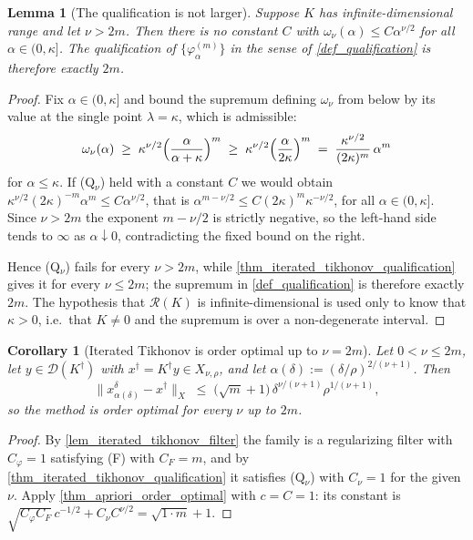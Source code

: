 \documentclass[a4paper]{report}
\theoremstyle{plain}
\newtheorem{lemma}[theorem]{Lemma}
\newtheorem{corollary}[theorem]{Corollary}
\theoremstyle{definition}
\theoremstyle{remark}
\newcommand{\Ran}{\mathcal{R}}
\newcommand{\Dom}{\mathcal{D}}
\newcommand{\dg}{^{\dagger}}
\begin{document}
\begin{lemma}[The qualification is not larger]
  \label{lem_iterated_tikhonov_qualification_sharp}
  Suppose $K$ has infinite-dimensional range and let $\nu > 2m$.  Then there is no
  constant $C$ with $\omega_{\nu}(\alpha) \le C\alpha^{\nu/2}$ for all
  $\alpha \in (0,\kappa]$.  The qualification of $\{\varphi^{(m)}_{\alpha}\}$ in the sense
  of \cref{def_qualification} is therefore exactly $2m$.
\end{lemma}
\begin{proof}
  Fix $\alpha \in (0,\kappa]$ and bound the supremum defining $\omega_{\nu}$ from below by
  its value at the single point $\lambda = \kappa$, which is admissible:
  \[
    \omega_{\nu}(\alpha) \;\ge\; \kappa^{\nu/2}
      \Bigl(\frac{\alpha}{\alpha+\kappa}\Bigr)^{m}
      \;\ge\; \kappa^{\nu/2}\Bigl(\frac{\alpha}{2\kappa}\Bigr)^{m}
      \;=\; \frac{\kappa^{\nu/2}}{(2\kappa)^{m}}\,\alpha^{m}
  \]
  for $\alpha \le \kappa$.  If (Q$_{\nu}$) held with a constant $C$ we would obtain
  $\kappa^{\nu/2}(2\kappa)^{-m}\alpha^{m} \le C\alpha^{\nu/2}$, that is
  $\alpha^{m-\nu/2} \le C(2\kappa)^{m}\kappa^{-\nu/2}$, for all $\alpha \in (0,\kappa]$.
  Since $\nu > 2m$ the exponent $m-\nu/2$ is strictly negative, so the left-hand side
  tends to $\infty$ as $\alpha \downarrow 0$, contradicting the fixed bound on the right.

  Hence (Q$_{\nu}$) fails for every $\nu > 2m$, while
  \cref{thm_iterated_tikhonov_qualification} gives it for every $\nu \le 2m$; the
  supremum in \cref{def_qualification} is therefore exactly $2m$.  The hypothesis that
  $\Ran(K)$ is infinite-dimensional is used only to know that $\kappa > 0$, i.e.\ that
  $K \ne 0$ and the supremum is over a non-degenerate interval.
\end{proof}


\begin{corollary}[Iterated Tikhonov is order optimal up to $\nu = 2m$]
  \label{cor_iterated_tikhonov_order_optimal}
  Let $0 < \nu \le 2m$, let $y \in \Dom(K\dg)$ with $x\dg = K\dg y \in X_{\nu,\rho}$, and
  let $\alpha(\delta) := (\delta/\rho)^{2/(\nu+1)}$.  Then
  \[
    \|x^{\delta}_{\alpha(\delta)} - x\dg\|_X \;\le\;
      \bigl(\sqrt{m}+1\bigr)\,\delta^{\nu/(\nu+1)}\rho^{1/(\nu+1)} ,
  \]
  so the method is order optimal for every $\nu$ up to $2m$.
\end{corollary}
\begin{proof}
  By \cref{lem_iterated_tikhonov_filter} the family is a regularizing filter with
  $C_{\varphi} = 1$ satisfying (F) with $C_F = m$, and by
  \cref{thm_iterated_tikhonov_qualification} it satisfies (Q$_{\nu}$) with $C_{\nu} = 1$
  for the given $\nu$.  Apply \cref{thm_apriori_order_optimal} with $c = C = 1$: its
  constant is $\sqrt{C_{\varphi}C_F}\,c^{-1/2} + C_{\nu}C^{\nu/2}
  = \sqrt{1\cdot m} + 1$.
\end{proof}
\end{document}
